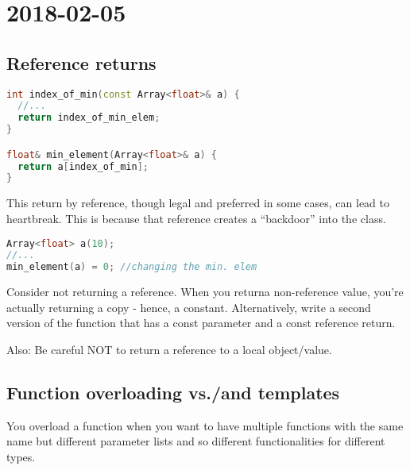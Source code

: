 \section{2018-02-05}

\subsection{Reference returns}

\begin{lstlisting}[language=C++]
int index_of_min(const Array<float>& a) {
  //...
  return index_of_min_elem;
}

float& min_element(Array<float>& a) {
  return a[index_of_min];
}
\end{lstlisting}

This return by reference, though legal and preferred in some cases, can lead to heartbreak. This is because that reference creates a ``backdoor'' into the class.

\begin{lstlisting}[language=C++]
Array<float> a(10);
//...
min_element(a) = 0; //changing the min. elem
\end{lstlisting}

Consider not returning a reference. When you returna non-reference value, you're actually returning a copy - hence, a constant. Alternatively, write a second version of the function that has a const parameter and a const reference return.

Also: Be careful NOT to return a reference to a local object/value.


\subsection{Function overloading vs./and templates}

You overload a function when you want to have multiple functions with the same name but different parameter lists and so different functionalities for different types.

